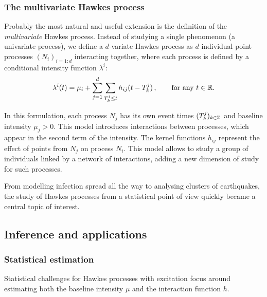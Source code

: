     \subsubsection{The multivariate Hawkes process} 
    Probably the most natural and useful extension is the definition of the \emph{multivariate} Hawkes process. 
    Instead of studying a single phenomenon (a univariate process), we define a $d$-variate Hawkes process as $d$ individual point processes $(N_i)_{i=1:d}$ interacting together, 
    where each process is defined by a conditional intensity function $\lambda^i$:
    \[\lambda^i(t) = \mu_i + \sum_{j=1}^{d}\sum_{T_k^j \leq t}{h_{ij}(t-T_k^j)}\,, \qquad \text{for any $t\in{\mathbb R}$.}\]

    In this formulation, each process $N_j$ has its own event times $(T_k^j)_{k\in{\mathbb Z}}$ and baseline intensity $\mu_j > 0$.
    This model introduces interactions between processes, which appear in the second term of the intensity.
    The kernel functions $h_{ij}$ represent the effect of points from $N_j$ on process $N_i$.
    This model allows to study a group of individuals linked by a network of interactions, adding a new dimension of study for such processes.

    From modelling infection spread all the way to analysing clusters of earthquakes, the study of Hawkes processes from a statistical point of view quickly became a central topic of interest.

    \subsection{Inference and applications}

    \subsubsection{Statistical estimation}
    
    Statistical challenges for Hawkes processes with excitation focus around estimating both the baseline intensity $\mu$ and the interaction function $h$.

